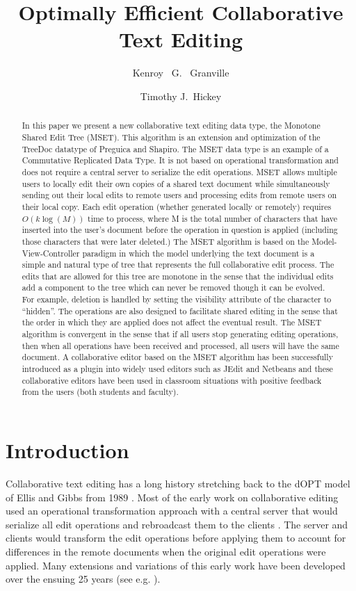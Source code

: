 \documentclass{amsart}
\title{Optimally Efficient Collaborative Text Editing}
\author{
Kenroy~ G.~ Granville
\and 
Timothy J.~Hickey 
}
\begin{document}
\maketitle

\begin{abstract}
In this paper we present a new collaborative text editing data type,  
the Monotone Shared Edit Tree (MSET). This algorithm is an extension
and optimization of the TreeDoc datatype of Preguica and Shapiro.  The MSET data type is an example of
a Commutative Replicated Data Type. It is not based on operational transformation 
and does not require a central server to serialize the
edit operations.
MSET allows multiple users to locally 
edit their own copies of a shared text document
while simultaneously sending out their local edits 
to remote users and processing edits from remote users 
on their local copy.
Each edit operation (whether generated locally or remotely) 
requires $O(k\log(M))$ time to process, where
M is the total number of characters that have inserted 
into the user's document before the operation in
question is applied (including those characters that were later deleted.)
The MSET algorithm is based on 
the Model-View-Controller paradigm in which the
model underlying the text document is a simple and 
natural type of tree that represents the full collaborative edit process.
The edits that are allowed for this tree are monotone in the sense that
the individual edits add a component to the tree which can never be removed
though it can be evolved. For example, deletion is handled by setting the
visibility attribute of the character to ``hidden''. The operations are also
designed to facilitate shared editing in the sense that the order in which
they are applied does not affect the eventual result.
The MSET algorithm is convergent in the sense that 
if all users stop generating
editing operations, then when all operations have 
been received and processed, all users will have
the same document. 
A collaborative editor based on the MSET algorithm 
has been successfully introduced as a plugin into widely used
editors such as JEdit and Netbeans and 
these collaborative editors have been used in classroom situations
with positive feedback from the users (both students and faculty).
\end{abstract}
\newpage
\tableofcontents
\newpage

\section{Introduction}
Collaborative text editing has a long history stretching back to the dOPT model of Ellis and Gibbs from 1989 \cite{ellis_concurrency_1989}. Most of the early work on collaborative editing used an operational transformation approach with a central server that would serialize all edit operations and rebroadcast them to the clients \cite{nichols_high-latency_1995}. The server and clients would transform the edit operations before applying them to account for differences in the remote documents when the original edit operations were applied. Many extensions and variations of this early work have been developed over the ensuing 25 years (see e.g. \cite{sum_operational_2004}).
\end{document}

